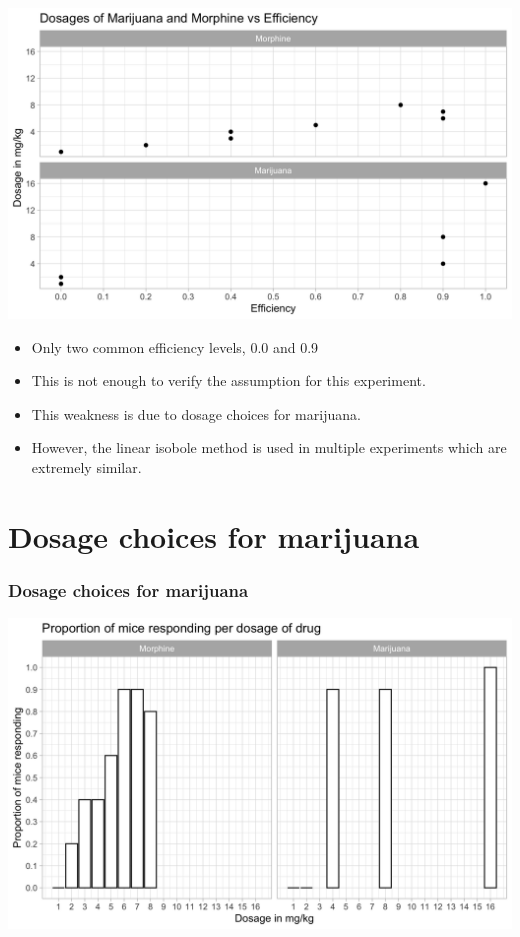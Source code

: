 \documentclass[14pt]{beamer}
\begin{document}
\begin{frame}
\includegraphics[scale=0.22]{dos_vs_eff.png}
\end{frame}

\begin{frame}
\begin{itemize}[label={$\blacktriangleright$}]
\item Only two common efficiency levels, 0.0 and 0.9
\item This is not enough to verify the assumption for this experiment.
\item This weakness is due to dosage choices for marijuana.
\item However, the linear isobole method is used in multiple experiments which are extremely similar.
\end{itemize}
\end{frame}

\section{Dosage choices for marijuana}

\begin{frame}
\frametitle{Dosage choices for marijuana}
\includegraphics[scale=0.22]{prop_bar.png}
\end{frame}
\end{document}

